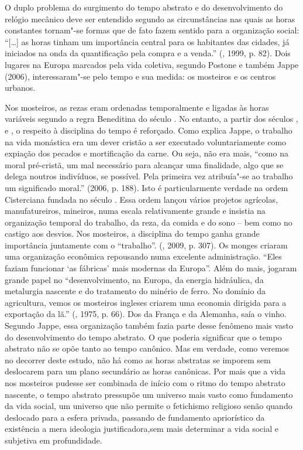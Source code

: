 O duplo problema do surgimento do tempo abstrato e do desenvolvimento do
relógio mecânico deve ser entendido segundo as circunstâncias nas quais
as horas constantes tornam"-se formas que de fato fazem sentido para a
organização social: ``[\ldots{}] as horas tinham um importância
central para os habitantes das cidades, já iniciados na onda da
quantificação pela compra e a venda.'' (, 1999, p. 82). Dois
lugares na Europa marcados pela vida coletiva, segundo Postone e também
Jappe (2006), interessaram"-se pelo tempo e sua medida: os mosteiros e os
centros urbanos.

Nos mosteiros, as rezas eram ordenadas temporalmente e ligadas às horas
variáveis segundo a regra Beneditina do século . No entanto, a partir
dos séculos ,  e , o respeito à disciplina do tempo é
reforçado. Como explica Jappe, o trabalho na vida monástica era um dever
cristão a ser executado voluntariamente como expiação dos pecados e
mortificação da carne. Ou seja, não era mais, ``como na moral
pré-cristã, um mal necessário para alcançar uma finalidade, algo que se
delega noutros indivíduos, se possível. Pela primeira vez atribuía"-se ao
trabalho um significado moral.'' (2006, p. 188). Isto é particularmente
verdade na ordem Cisterciana fundada no século . Essa ordem lançou
vários projetos agrícolas, manufatureiros, mineiros, numa escala
relativamente grande e insistia na organização temporal do trabalho, da
reza, da comida e do sono -- bem como no castigo aos desvios. Nos
mosteiros, a disciplina do tempo ganha grande importância juntamente com
o ``trabalho''. (, 2009, p. 307). Os monges criaram uma
organização econômica repousando numa excelente administração. ``Eles
faziam funcionar `as fábricas' mais modernas da Europa''. Além do mais,
jogaram grande papel no ``desenvolvimento, na Europa, da energia
hidráulica, da metalurgia nascente e do tratamento do minério de ferro.
No domínio da agricultura, vemos os mosteiros ingleses criarem uma
economia dirigida para a exportação da lã.'' (, 1975, p. 66). Dos
da França e da Alemanha, saía o vinho. Segundo Jappe, essa organização
também fazia parte desse fenômeno mais vasto do desenvolvimento do tempo
abstrato. O que poderia significar que o tempo abstrato não se opõe
tanto ao tempo canônico. Mas em verdade, como veremos no decorrer deste
estudo, não há como as horas abstratas se imporem sem deslocarem para um
plano secundário as horas canônicas. Por mais que a vida nos mosteiros
pudesse ser combinada de início com o ritmo do tempo abstrato nascente, o tempo
abstrato pressupõe um universo mais vasto como fundamento da vida social,
um universo que não permite o fetichismo religioso senão quando
deslocado para a esfera privada, passando de fundamento apriorístico
da existência a mera ideologia justificadora,sem mais determinar a
vida social e subjetiva em profundidade.


